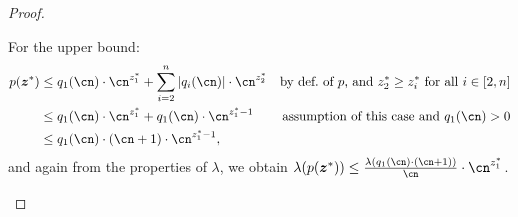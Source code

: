 \begin{proof}
\begin{claimproof}
\begin{description}
\begin{description}
              For the upper bound:
              \begin{align*}
                p(\vec z^*) & \leq q_1(\cn)\cdot \cn^{z_1^*} + \sum_{i=2}^n
                \abs{q_i(\cn)} \cdot \cn^{z_2^*}
                            & \text{by def.~of $p$, and $z_2^* \geq z_i^*$  for
                  all $i \in
                    [2,n]$}
                \\
                            & \leq q_1(\cn)\cdot \cn^{z_1^*} + q_1(\cn) \cdot
                \cn^{z_1^*-1}
                            & \text{assumption of this case and $q_1(\cn) > 0$}
                \\
                            & \leq q_1(\cn) \cdot (\cn+1) \cdot \cn^{z_1^*-1},
              \end{align*}
              and again from the properties of $\lambda$,
              we obtain $\lambda(p(\vec z^*)) \leq \frac{\lambda(q_1(\cn) \cdot
                  (\cn
                  + 1))}{\cn} \cdot \cn^{z_1^*}$.
  

\end{description}
\end{description}
\end{claimproof}
\end{proof}
